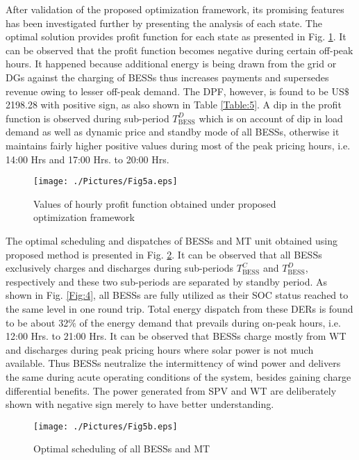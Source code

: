 \documentclass[journal]{IEEEtran}
\begin{document}
\par After validation of the proposed optimization framework, its promising features has been investigated further by presenting the analysis of each state. The optimal solution provides profit function for each state as presented in Fig. \ref{Fig:5}. It can be observed that the profit function becomes negative during certain off-peak hours. It happened because additional energy is being drawn from the grid or DGs against the charging of BESSs thus increases payments and supersedes revenue owing to lesser off-peak demand. The DPF, however, is found to be US$\$$ 2198.28 with positive sign, as also shown in Table \ref{Table:5}. A dip in the profit function is observed during sub-period $T_{\text{BESS}}^{D}$ which is on account of dip in load demand as well as dynamic price and standby mode of all BESSs, otherwise it maintains fairly higher positive values during most of the peak pricing hours, i.e. 14:00 Hrs and 17:00 Hrs. to 20:00 Hrs. 
\begin{figure}[!ht]
	\centering
\texttt{[image: ./Pictures/Fig5a.eps]}
\caption{Values of hourly profit function obtained under proposed optimization framework \label{Fig:5}}
\end{figure}
%
%
%
%  
\par The optimal scheduling and dispatches of BESSs and MT unit obtained using proposed method is presented in Fig. \ref{Fig:6}. It can be observed that all BESSs exclusively charges and discharges during sub-periods $T_{\text{BESS}}^{C}$ and $T_{\text{BESS}}^{D}$, respectively and these two sub-periods are separated by standby period.  As shown in Fig. \ref{Fig:4}, all BESSs are fully utilized as their SOC status reached to the same level in one round trip. Total energy dispatch from these DERs is found to be about 32$\%$ of the energy demand that prevails during on-peak hours, i.e. 12:00 Hrs. to 21:00 Hrs. It can be observed that BESSs charge mostly from WT and discharges during peak pricing hours where solar power is not much available. Thus BESSs neutralize the intermittency of wind power and delivers the same during acute operating conditions of the system, besides gaining charge differential benefits. The power generated from SPV and WT are deliberately shown with negative sign merely to have better understanding.
\begin{figure}[!ht]
	\centering
	\texttt{[image: ./Pictures/Fig5b.eps]}
	\caption{Optimal scheduling of all BESSs and MT\label{Fig:6}}
\end{figure}
\end{document}

